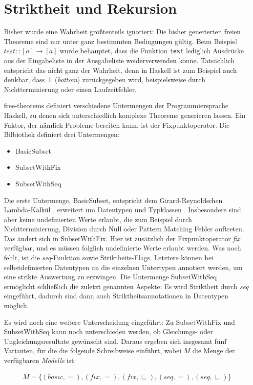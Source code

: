 \section{Striktheit und Rekursion}

\label{sec:striktheit-und-rekursion}

Bisher wurde eine Wahrheit größtenteils ignoriert: Die bisher generierten freien Theoreme sind nur unter ganz bestimmten
Bedingungen gültig. Beim Beispiel \texttt{$test :: [a] \rightarrow [a]$} wurde behauptet, dass die Funktion \texttt{test}
lediglich Ausdrücke aus der Eingabeliste in der Ausgabeliste weiderverwenden könne. Tatsächlich entspricht das nicht ganz der
Wahrheit, denn in Haskell ist zum Beispiel auch denkbar, dass $\bot$ (\textit{bottom}) zurückgegeben wird, beispielsweise
durch Nichtterminierung oder einen Laufzeitfehler.

free-theorems definiert verschiedene Untermengen der Programmiersprache Haskell, zu denen sich unterschiedlich komplexe
Theoreme generieren lassen. Ein Faktor, der nämlich Probleme bereiten kann, ist der Fixpunktoperator.
Die Bilbiothek definiert drei Untermengen:

\begin{itemize}
   \item BasicSubset
   \item SubsetWithFix
   \item SubsetWithSeq
\end{itemize}

Die erste Untermenge, BasicSubset, entspricht dem Girard-Reynoldschen Lambda-Kalkül \cite{bla}, erweitert um Datentypen und
Typklassen \cite{freetheorems}. Insbesondere sind aber keine undefinierten Werte erlaubt, die zum Beispiel durch Nichtterminierung,
Division durch Null oder Pattern Matching Fehler auftreten.
Das ändert sich in SubsetWithFix. Hier ist zusätzlich der Fixpunktoperator \textit{fix} verfügbar, und es müssen folglich undefinierte
Werte erlaubt werden. Was noch fehlt, ist die \textit{seq}-Funktion sowie Striktheits-Flags. Letztere können bei selbstdefinierten
Datentypen an die einzelnen Untertypen  annotiert werden,
um eine strikte Auswertung zu erzwingen.
Die Untermenge SubsetWithSeq ermöglicht schließlich die zuletzt genannten Aspekte: Es wird Striktheit durch \textit{seq}
eingeführt, dadurch sind dann auch Striktheitsannotationen in Datentypen möglich.

Es wird noch eine weitere Unterscheidung eingeführt: Zu SubsetWithFix und SubsetWithSeq kann noch unterschieden werden,
ob Gleichungs- oder Ungleichungsresultate gewünscht sind. 
Daraus ergeben sich insgesamt fünf Varianten, für die \cite{freetheorems} die folgende Schreibweise einführt, wobei $M$ die Menge
der verfügbaren \textit{Modelle} ist:

\begin{align}
M = \{(basic, =), (fix, =), (fix, \sqsubseteq), (seq, =), (seq, \sqsubseteq)\}
\end{align}